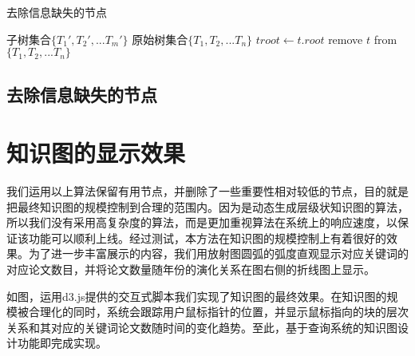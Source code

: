 \begin{algorithm}
\caption{去除信息缺失的节点}
\label{ago1}
\begin{algorithmic}[1] %
\Ensure 子树集合$\{T_1',T_2',...T_m'\}$ %
\Require 原始树集合$\{T_1,T_2,...T_n\}$ %
  \State $troot \gets t.root$
    \State remove $t$ from $\{T_1,T_2,...T_n\}$
  \EndIf
\EndFor
\end{algorithmic}
\end{algorithm}

\subsection{去除信息缺失的节点}

\section{知识图的显示效果}
我们运用以上算法保留有用节点，并删除了一些重要性相对较低的节点，目的就是把最终知识图的规模控制到合理的范围内。因为是动态生成层级状知识图的算法，所以我们没有采用高复杂度的算法，而是更加重视算法在系统上的响应速度，以保证该功能可以顺利上线。经过测试，本方法在知识图的规模控制上有着很好的效果。为了进一步丰富展示的内容，我们用放射图圆弧的弧度直观显示对应关键词的对应论文数目，并将论文数量随年份的演化关系在图右侧的折线图上显示。

如图，运用d3.js提供的交互式脚本我们实现了知识图的最终效果。在知识图的规模被合理化的同时，系统会跟踪用户鼠标指针的位置，并显示鼠标指向的块的层次关系和其对应的关键词论文数随时间的变化趋势。至此，基于查询系统的知识图设计功能即完成实现。